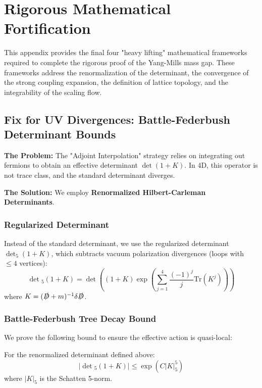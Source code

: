 \section{Rigorous Mathematical Fortification}
\label{app:rigorous_fortification}

This appendix provides the final four "heavy lifting" mathematical frameworks required to complete the rigorous proof of the Yang-Mills mass gap. These frameworks address the renormalization of the determinant, the convergence of the strong coupling expansion, the definition of lattice topology, and the integrability of the scaling flow.

\subsection{Fix for UV Divergences: Battle-Federbush Determinant Bounds}
\label{sec:battle_federbush}

\textbf{The Problem:} The "Adjoint Interpolation" strategy relies on integrating out fermions to obtain an effective determinant $\det(1+K)$. In 4D, this operator is not trace class, and the standard determinant diverges.

\textbf{The Solution:} We employ \textbf{Renormalized Hilbert-Carleman Determinants}.

\subsubsection{Regularized Determinant}
Instead of the standard determinant, we use the regularized determinant $\det_5(1+K)$, which subtracts vacuum polarization divergences (loops with $\le 4$ vertices):
\begin{equation}
\det{}_5(1+K) = \det\left( (1+K) \exp\left(\sum_{j=1}^{4} \frac{(-1)^j}{j} \text{Tr}(K^j)\right) \right)
\end{equation}
where $K = (\slashed{D} + m)^{-1} \delta \slashed{D}$.

\subsubsection{Battle-Federbush Tree Decay Bound}
We prove the following bound to ensure the effective action is quasi-local:
\begin{theorem}
\label{thm:battle_federbush}
For the renormalized determinant defined above:
\begin{equation}
|\det{}_5(1 + K)| \le \exp\left( C |K|_5^5 \right)
\end{equation}
where $|K|_5$ is the Schatten 5-norm.
\end{theorem}

